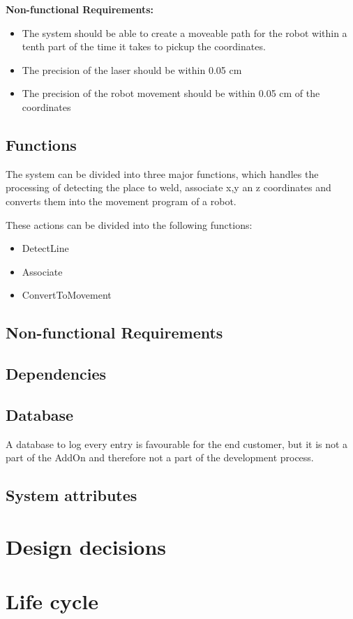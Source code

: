 \documentclass[12pt]{report} %
\begin{document}
\textbf{Non-functional Requirements:}

\begin{itemize}

\item The system should be able to create a moveable path for the robot within a tenth part of the time it takes to pickup the coordinates.
\item The precision of the laser should be within 0.05 cm
\item The precision of the robot movement should be within 0.05 cm of the coordinates

\end{itemize}

\subsection{Functions}

The system can be divided into three major functions, which handles the processing of detecting the place to weld, associate x,y an z coordinates and converts them into the movement program of a robot.

These actions can be divided into the following functions:

\begin{itemize}

\item DetectLine
\item Associate
\item ConvertToMovement

\end{itemize}



\subsection{Non-functional Requirements}

\subsection{Dependencies}

\subsection{Database}
A database to log every entry is favourable for the end customer, but it is not a part of the AddOn and therefore not a part of the development process.

\subsection{System attributes}

\section{Design decisions}

\section{Life cycle}
\end{document}
